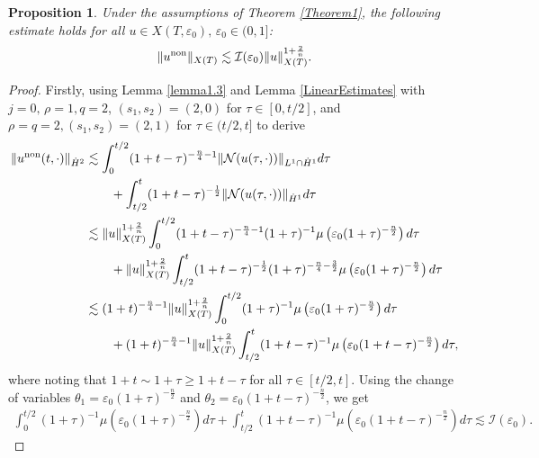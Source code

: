 \documentclass[11pt,reqno]{amsart}
\newtheorem{proposition}{Proposition}[section]
\begin{document}
\begin{proposition}\label{Pro1.1}
     Under the assumptions of Theorem \ref{Theorem1}, the following estimate holds for all $u \in X(T, \varepsilon_0),\, \varepsilon_0 \in (0, 1]$:
     \begin{align*}
         \|u^{\rm non}\|_{X(T)} \lesssim \mathcal{I}(\varepsilon_0)\|u\|_{X(T)}^{1+\frac{2}{n}}.
     \end{align*}
   
\end{proposition}
     \begin{proof}
         Firstly, using Lemma \ref{lemma1.3} and
         Lemma \ref{LinearEstimates} with $ j= 0, \,\rho = 1, q = 2$, $(s_1, s_2) =(2,0)$ for $\tau \in [0, t/2]$, and $\rho=q =2, (s_1,s_2) =(2,1)$ for $\tau \in (t/2, t]$ to derive
         \begin{align*}
             \| u^{\rm non}(t,\cdot)\|_{\dot{H}^2} &\lesssim \int_0^{t/2} (1+t-\tau)^{-\frac{n}{4}-1} \| \mathcal{N}(u(\tau,\cdot))\|_{L^1 \cap \dot{H}^1} d\tau\\
             &\qquad + \int_{t/2}^t (1+t-\tau)^{-\frac{1}{2}} \| \mathcal{N}(u(\tau,\cdot))\|_{ \dot{H}^1} d\tau\\
             &\lesssim \|u\|_{X(T)}^{1+\frac{2}{n}}\int_0^{t/2} (1+t-\tau)^{-\frac{n}{4}-1} (1+\tau)^{-1} \mu\left(\varepsilon_0 (1+\tau)^{-\frac{n}{2}}\right) d\tau\\
             &\qquad + \|u\|_{X(T)}^{1+\frac{2}{n}}\int_{t/2}^t (1+t-\tau)^{-\frac{1}{2}} (1+\tau)^{-\frac{n}{4}-\frac{3}{2}} \mu\left(\varepsilon_0 (1+\tau)^{-\frac{n}{2}}\right) d\tau\\
             &\lesssim  (1+t)^{-\frac{n}{4}-1}\|u\|_{X(T)}^{1+\frac{2}{n}} \int_0^{t/2}(1+\tau)^{-1} \mu\left(\varepsilon_0 (1+\tau)^{-\frac{n}{2}}\right) d\tau\\
             &\qquad +  (1+t)^{-\frac{n}{4}-1}\|u\|_{X(T)}^{1+\frac{2}{n}} \int_{t/2}^t (1+t-\tau)^{-1} \mu\left(\varepsilon_0 (1+t-\tau)^{-\frac{n}{2}}\right) d\tau,
         \end{align*}
where noting that $1+t \sim 1+\tau \geq 1+t-\tau$ for all $\tau \in [t/2, t]$. Using the change of variables $\theta_1 = \varepsilon_0 (1+\tau)^{-\frac{n}{2}}$ and $\theta_2 = \varepsilon_0(1+t-\tau)^{-\frac{n}{2}}$, we get
\begin{align}
    \int_0^{t/2} (1+\tau)^{-1} \mu\left(\varepsilon_0 (1+\tau)^{-\frac{n}{2}}\right) d\tau   +
    \int_{t/2}^{t} (1+t-\tau)^{-1} \mu\left(\varepsilon_0 (1+t-\tau)^{-\frac{n}{2}}\right) d\tau \lesssim \mathcal{I}(\varepsilon_0). \label{Impor_Re1}

\end{align}
\end{proof}
\end{document}
